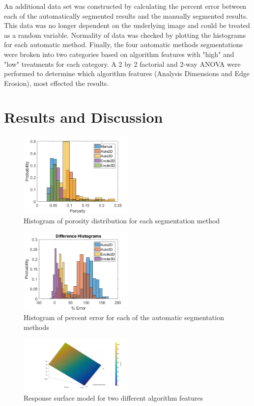 \documentclass[11pt, twocolumn]{article}
\begin{document}
An additional data set was constructed by calculating the percent error between each of the automatically segmented results and the manually segmented results. This data was no longer dependent on the underlying image and could be treated as a random variable. Normality of data was checked by plotting the histograms for each automatic method. Finally, the four automatic methods segmentations were broken into two categories based on algorithm features with "high" and "low" treatments for each category. A 2 by 2 factorial and 2-way ANOVA were performed to determine which algorithm features (Analysis Dimensions and Edge Erosion), most effected the results. 

\section{Results and Discussion} 
\begin{figure}[H]
	\centering
	\includegraphics[width=0.5\textwidth]{DataHistograms.png}
	\caption{Histogram of porosity distribution for each segmentation method}
	\label{fig:DataHist}
\end{figure}

\begin{figure}[H]
	\centering
	\includegraphics[width=0.5\textwidth]{DifferenceHistograms.png}
	\caption{Histogram of percent error for each of the automatic segmentation methods}
	\label{fig:DiffHist}
\end{figure}

\begin{figure}[H]
	\centering
	\includegraphics[width=0.5\textwidth]{ResponseSurface.png}
	\caption{Response surface model for two different algorithm features}
	\label{fig:Surf}
\end{figure}
\end{document}
